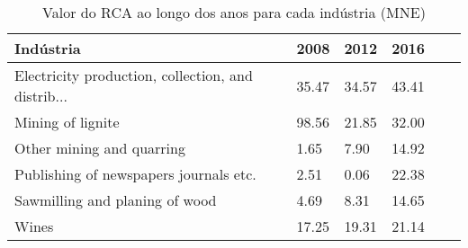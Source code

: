 \begin{table}
\centering
\caption{Valor do RCA ao longo dos anos para cada indústria (MNE)}
\begin{tabular}{p{6cm}p{1.5cm}p{1.5cm}p{1.5cm}p{1.5cm}p{1.5cm}}
\toprule
                                         Indústria &  2008 &  2012 &  2016 \\
\midrule
Electricity production, collection, and distrib... & 35.47 & 34.57 & 43.41 \\
                                 Mining of lignite & 98.56 & 21.85 & 32.00 \\
                         Other mining and quarring &  1.65 &  7.90 & 14.92 \\
            Publishing of newspapers journals etc. &  2.51 &  0.06 & 22.38 \\
                    Sawmilling and planing of wood &  4.69 &  8.31 & 14.65 \\
                                             Wines & 17.25 & 19.31 & 21.14 \\
\bottomrule
\end{tabular}
\end{table}
